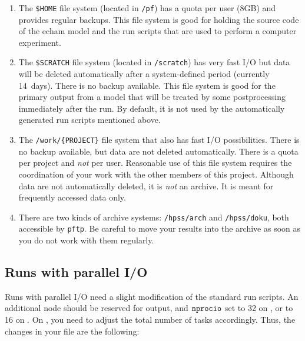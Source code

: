 \begin{enumerate}

\item

The {\tt \$HOME} file system (located in {\tt /pf}) has a quota per user (8GB)
and provides regular backups. This file system is good for holding the source
code of the echam model and the run scripts that are used to perform a computer
experiment.

\item

The {\tt \$SCRATCH} file system (located in {\tt /scratch}) has very fast I/O
but data will be deleted automatically after a system-defined period (currently
14~days). There is no backup available. This file system is good for the
primary output from a model that will be treated by some postprocessing
immediately after the run. By default, it is not used by the automatically
generated run scripts mentioned above.

\item

The {\tt /work/\{PROJECT\}} file system that also has fast I/O
possibilities. There is no backup available, but data are not deleted
automatically. There is a quota per project and \emph{not} per user. Reasonable
use of this file system requires the coordination of your work with the other
members of this project. Although data are not automatically deleted, it is
\emph{not} an archive. It is meant for frequently accessed data only.

\item

There are two kinds of archive systems: {\tt /hpss/arch} and {\tt /hpss/doku},
both accessible by {\tt pftp}. Be careful to move your results into the archive
as soon as you do not work with them regularly.

\end{enumerate}

\subsection{Runs with parallel I/O}

Runs with parallel I/O need a slight modification of the standard run scripts.
An additional node should be reserved for output, and ${\tt nprocio}$
set to 32 on 
\blizzard, or to 16 on \thunder. On \blizzard, you
need to adjust the total number of tasks accordingly. Thus, the changes
in your  file are the following: 


